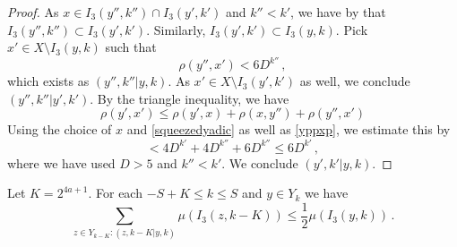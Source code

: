 \begin{proof}
    As $x\in I_3(y'',k'')\cap I_3(y',k')$ and $k''< k'$, we have by  that
    $I_3(y'',k'')\subset I_3(y',k')$. Similarly,
    $I_3(y',k')\subset I_3(y,k)$.
    Pick $x'\in X\setminus I_3(y,k)$ such that
    \begin{equation}\label{yppxp}
        \rho(y'',x')< 6D^{k''}\, ,
    \end{equation}
    which exists as $(y'',k''|y,k)$. As
    $x'\in X\setminus I_3(y',k')$ as well, we conclude
    $(y'',k''| y',k')$.
    By the triangle inequality, we have
    \begin{equation}
    \rho(y',x')\le \rho(y',x)+\rho(x,y'')+\rho(y'',x')
    \end{equation}
    Using the choice of $x$ and \eqref{squeezedyadic}
    as well as \eqref{yppxp}, we estimate this by
    \begin{equation}
    < 4D^{k'}+4D^{k''}+6D^{k''}\le 6D^{k'}\, ,
    \end{equation}
    where we have used $D>5$ and $k''<k'$.
    We conclude $(y',k'|y,k)$.
\end{proof}


\begin{lemma}
    \label{small-boundary}
    Let $K = 2^{4a+1}$. For each $-S+K\le k\le S$ and $y\in Y_k$ we have
        \begin{equation}
            \label{new-small-boundary}
            \sum_{z\in Y_{k-K}: (z,k-K|y,k)}\mu(I_3(z,k-K)) \le \frac 12 \mu(I_3(y,k))\,.
        \end{equation}
\end{lemma}

